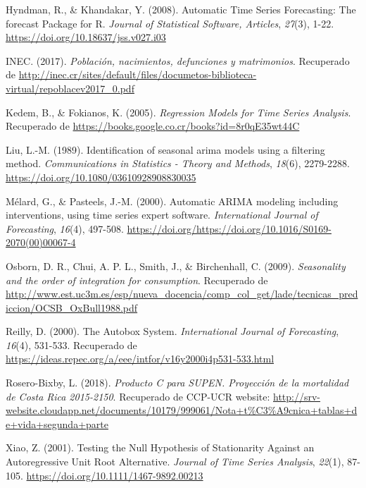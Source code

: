 \documentclass[
]{article}
\begin{document}
\leavevmode\hypertarget{ref-auto.arima}{}%
Hyndman, R., \& Khandakar, Y. (2008). Automatic Time Series Forecasting:
The forecast Package for R. \emph{Journal of Statistical Software,
Articles}, \emph{27}(3), 1-22.
\url{https://doi.org/10.18637/jss.v027.i03}

\leavevmode\hypertarget{ref-calidad_vitales}{}%
INEC. (2017). \emph{Población, nacimientos, defunciones y matrimonios}.
Recuperado de
\url{http://inec.cr/sites/default/files/documetos-biblioteca-virtual/repoblacev2017_0.pdf}

\leavevmode\hypertarget{ref-kedem}{}%
Kedem, B., \& Fokianos, K. (2005). \emph{Regression Models for Time
Series Analysis}. Recuperado de
\url{https://books.google.co.cr/books?id=8r0qE35wt44C}

\leavevmode\hypertarget{ref-liu}{}%
Liu, L.-M. (1989). Identification of seasonal arima models using a
filtering method. \emph{Communications in Statistics - Theory and
Methods}, \emph{18}(6), 2279-2288.
\url{https://doi.org/10.1080/03610928908830035}

\leavevmode\hypertarget{ref-melard}{}%
Mélard, G., \& Pasteels, J.-M. (2000). Automatic ARIMA modeling
including interventions, using time series expert software.
\emph{International Journal of Forecasting}, \emph{16}(4), 497-508.
\url{https://doi.org/https://doi.org/10.1016/S0169-2070(00)00067-4}

\leavevmode\hypertarget{ref-Osborn2009SEASONALITYAT}{}%
Osborn, D. R., Chui, A. P. L., Smith, J., \& Birchenhall, C. (2009).
\emph{Seasonality and the order of integration for consumption}.
Recuperado de
\url{http://www.est.uc3m.es/esp/nueva_docencia/comp_col_get/lade/tecnicas_prediccion/OCSB_OxBull1988.pdf}

\leavevmode\hypertarget{ref-autobox}{}%
Reilly, D. (2000). The Autobox System. \emph{International Journal of
Forecasting}, \emph{16}(4), 531-533. Recuperado de
\url{https://ideas.repec.org/a/eee/intfor/v16y2000i4p531-533.html}

\leavevmode\hypertarget{ref-supenprodc}{}%
Rosero-Bixby, L. (2018). \emph{Producto C para SUPEN. Proyección de la
mortalidad de Costa Rica 2015-2150}. Recuperado de CCP-UCR website:
\url{http://srv-website.cloudapp.net/documents/10179/999061/Nota+t\%C3\%A9cnica+tablas+de+vida+segunda+parte}

\leavevmode\hypertarget{ref-doi:10.1111ux2f1467-9892.00213}{}%
Xiao, Z. (2001). Testing the Null Hypothesis of Stationarity Against an
Autoregressive Unit Root Alternative. \emph{Journal of Time Series
Analysis}, \emph{22}(1), 87-105.
\url{https://doi.org/10.1111/1467-9892.00213}
\end{document}
